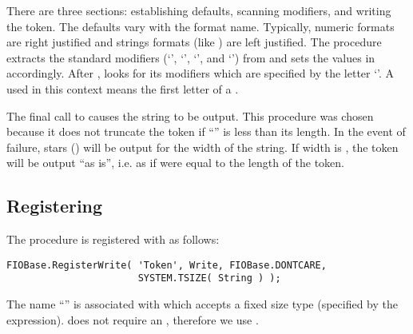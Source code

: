There are three sections: establishing defaults,
scanning modifiers, and writing the token.  The defaults vary with the
format name.  Typically, numeric formats are right justified and
strings formats (like ) are left justified.  The
procedure  extracts the standard
modifiers (`',
`', `', and `') from
 and sets the values in  accordingly.
After ,  looks for its modifiers
which are specified by the letter `'.  A
used in this context means the first letter of a .

The final call to  causes
the string to be output.  This procedure was chosen because it does
not truncate the token if ``'' is less than its length.
In the event of failure, stars (\code{*}) will be output for the
width of the string.  If width is , the token will be output
``as is'', i.e. as if  were equal to the length of the token.


        
\subsection{Registering }
\label{RegisterWrite}
The procedure is registered with  as follows:
\begin{verbatim}
FIOBase.RegisterWrite( 'Token', Write, FIOBase.DONTCARE,
                       SYSTEM.TSIZE( String ) );
\end{verbatim}
The name ``'' is associated with  which
accepts a fixed size type (specified by the  expression).
 does not require an , therefore
we use .


